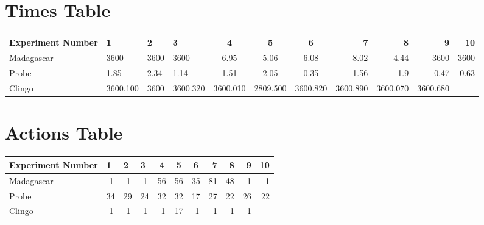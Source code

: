 \documentclass[8pt]{article}
\begin{document}
\begin{landscape}
\section{Times Table}\begin{tabular}{ | l | l | l | l | c | c | c | r | r | r | r | }\hline
Experiment Number & 1 & 2 & 3 & 4 & 5 & 6 & 7 & 8 & 9 & 10\\  \hline
Madagascar & 3600 & 3600 & 3600 & 6.95 & 5.06 & 6.08 & 8.02 & 4.44 & 3600 & 3600\\  \hline
Probe & 1.85 & 2.34 & 1.14 & 1.51 & 2.05 & 0.35 & 1.56 & 1.9 & 0.47 & 0.63\\  \hline
Clingo & 3600.100 & 3600 & 3600.320 & 3600.010 & 2809.500 & 3600.820 & 3600.890 & 3600.070 & 3600.680\\  \hline
\end{tabular}
\section{Actions Table}\begin{tabular}{ | l | l | l | l | c | c | c | r | r | r | r | }\hline
Experiment Number & 1 & 2 & 3 & 4 & 5 & 6 & 7 & 8 & 9 & 10\\ \hline
 Madagascar & -1 & -1 & -1 & 56 & 56 & 35 & 81 & 48 & -1 & -1\\ \hline
 Probe & 34 & 29 & 24 & 32 & 32 & 17 & 27 & 22 & 26 & 22\\ \hline
 Clingo & -1 & -1 & -1 & -1 & 17 & -1 & -1 & -1 & -1\\ \hline
\end{tabular}
\end{landscape}
\end{document}
